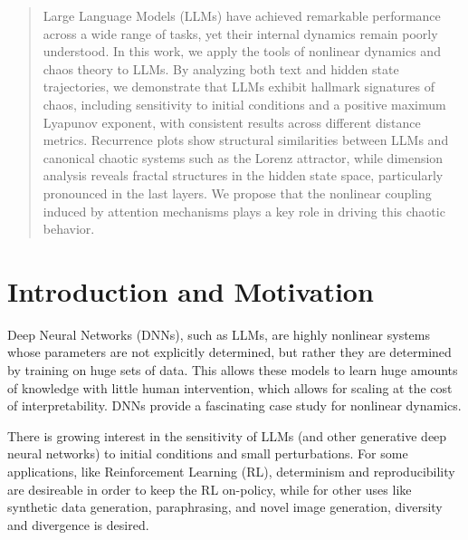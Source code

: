 \documentclass[a4paper,12pt]{article}
\begin{document}
\begin{abstract}
    Large Language Models (LLMs) have achieved remarkable performance across a wide range of tasks, yet their internal dynamics remain poorly understood. In this work, we apply the tools of nonlinear dynamics and chaos theory to LLMs. By analyzing both text and hidden state trajectories, we demonstrate that LLMs exhibit hallmark signatures of chaos, including sensitivity to initial conditions and a positive maximum Lyapunov exponent, with consistent results across different distance metrics. Recurrence plots show structural similarities between LLMs and canonical chaotic systems such as the Lorenz attractor, while dimension analysis reveals fractal structures in the hidden state space, particularly pronounced in the last layers. We propose that the nonlinear coupling induced by attention mechanisms plays a key role in driving this chaotic behavior. 
\end{abstract}
\newpage
{
  \hypersetup{linkcolor=black}
  \tableofcontents
}
\newpage

\section{Introduction and Motivation}

Deep Neural Networks (DNNs), such as LLMs, are highly nonlinear systems whose parameters are not explicitly determined, but rather they are determined by training on huge sets of data.
This allows these models to learn huge amounts of knowledge with little human intervention, which allows for scaling at the cost of interpretability.
DNNs provide a fascinating case study for nonlinear dynamics.

There is growing interest in the sensitivity of LLMs (and other generative deep neural networks) to initial conditions and small perturbations. For some applications, like Reinforcement Learning (RL), determinism and reproducibility are desireable in order to keep the RL on-policy, while for other uses like synthetic data generation, paraphrasing, and novel image generation, diversity and divergence is desired.
\end{document}
